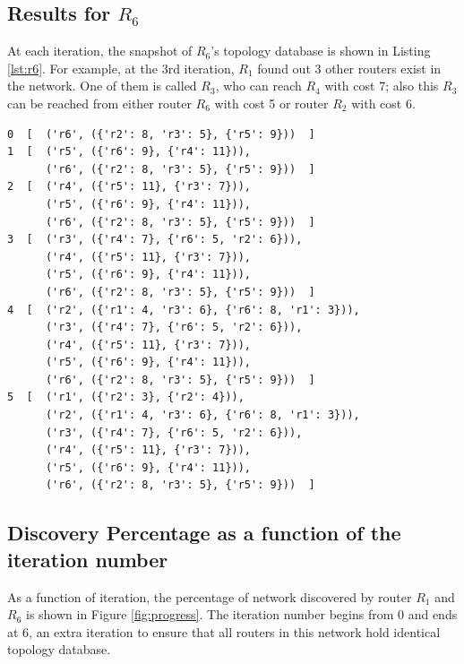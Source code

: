 \documentclass[12pt]{article}  %
\theoremstyle{definition}
\theoremstyle{remark}
\begin{document}
\subsection{Results for $R_6$}
At each iteration, the snapshot of $R_6$'s topology database is shown in Listing \ref{lst:r6}.
For example, at the 3rd iteration, $R_1$ found out 3 other routers exist in the network.
One of them is called $R_3$, who can reach $R_4$ with cost 7;
also this $R_3$ can be reached from either router $R_6$ with cost 5 or router $R_2$ with cost 6.

\begin{lstlisting}
0  [  ('r6', ({'r2': 8, 'r3': 5}, {'r5': 9}))  ]
1  [  ('r5', ({'r6': 9}, {'r4': 11})),
      ('r6', ({'r2': 8, 'r3': 5}, {'r5': 9}))  ]
2  [  ('r4', ({'r5': 11}, {'r3': 7})),
      ('r5', ({'r6': 9}, {'r4': 11})),
      ('r6', ({'r2': 8, 'r3': 5}, {'r5': 9}))  ]
3  [  ('r3', ({'r4': 7}, {'r6': 5, 'r2': 6})),
      ('r4', ({'r5': 11}, {'r3': 7})),
      ('r5', ({'r6': 9}, {'r4': 11})),
      ('r6', ({'r2': 8, 'r3': 5}, {'r5': 9}))  ]
4  [  ('r2', ({'r1': 4, 'r3': 6}, {'r6': 8, 'r1': 3})),
      ('r3', ({'r4': 7}, {'r6': 5, 'r2': 6})),
      ('r4', ({'r5': 11}, {'r3': 7})),
      ('r5', ({'r6': 9}, {'r4': 11})),
      ('r6', ({'r2': 8, 'r3': 5}, {'r5': 9}))  ]
5  [  ('r1', ({'r2': 3}, {'r2': 4})),
      ('r2', ({'r1': 4, 'r3': 6}, {'r6': 8, 'r1': 3})),
      ('r3', ({'r4': 7}, {'r6': 5, 'r2': 6})),
      ('r4', ({'r5': 11}, {'r3': 7})),
      ('r5', ({'r6': 9}, {'r4': 11})),
      ('r6', ({'r2': 8, 'r3': 5}, {'r5': 9}))  ]
\end{lstlisting}

\subsection{Discovery Percentage as a function of the iteration number}
As a function of iteration, the percentage of network discovered by router $R_1$ and $R_6$ is shown in Figure \ref{fig:progress}.
The iteration number begins from 0 and ends at 6, an extra iteration to ensure that all routers in this network hold identical topology database.
\end{document}
